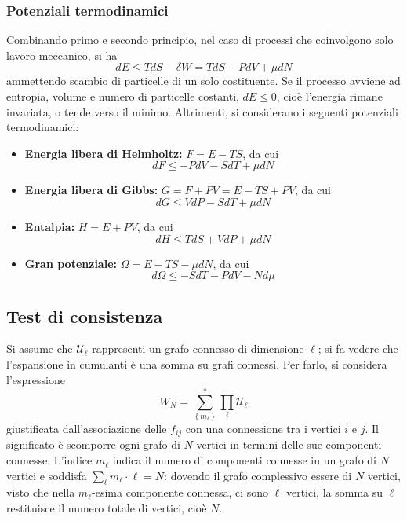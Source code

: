 \documentclass[11pt, a4paper]{scrartcl}
\theoremstyle{style}
\theoremstyle{style1}
\numberwithin{equation}{subsection}
\begin{document}
\subsubsection{Potenziali termodinamici}
Combinando primo e secondo principio, nel caso di processi che coinvolgono solo lavoro meccanico, si ha
\begin{equation}
	dE \le TdS - \delta W = TdS - PdV + \mu dN
\end{equation}
ammettendo scambio di particelle di un solo costituente.
Se il processo avviene ad entropia, volume e numero di particelle costanti, $dE \le 0$, cio\`e l'energia rimane invariata, o tende verso il minimo.
Altrimenti, si considerano i seguenti potenziali termodinamici:
\begin{itemize}
	\item \textbf{Energia libera di Helmholtz:} $F = E - TS$, da cui
	\begin{equation}
		dF \le -PdV - SdT +\mu dN 
	\end{equation}	
\item \textbf{Energia libera di Gibbs:} $G = F+PV = E - TS + PV$, da cui
	\begin{equation}
		dG \le  VdP - SdT + \mu dN
	\end{equation}
\item \textbf{Entalpia:} $H = E + PV$, da cui
	\begin{equation}
		dH \le TdS + VdP + \mu dN
	\end{equation}
\item \textbf{Gran potenziale:} $\Omega = E -TS - \mu dN$, da cui
\begin{equation}
	d\Omega \le -SdT - PdV - N d\mu 
\end{equation}	
\end{itemize}

\subsection{Test di consistenza}
Si assume che $\mathcal{U} _\ell $ rappresenti un grafo connesso di dimensione $\ell $; si fa vedere che l'espansione in cumulanti \`e una somma su grafi connessi.
Per farlo, si considera l'espressione
\[
W_N = \sum_{\left\{ m_\ell  \right\} }^* \prod_\ell \mathcal{U} _\ell 
\] 
giustificata dall'associazione delle $f_{ij} $ con una connessione tra i vertici $i$ e $j$.
Il significato \`e scomporre ogni grafo di $N$ vertici in termini delle sue componenti connesse.
L'indice $m_\ell $ indica il numero di componenti connesse in un grafo di $N$ vertici e soddisfa $\sum_{\ell }^{} m_\ell\cdot \ell = N $: dovendo il grafo complessivo essere di $N$ vertici, visto che nella $m_\ell $-esima componente connessa, ci sono $\ell $ vertici, la somma su $\ell $ restituisce il numero totale di vertici, cio\`e $N$.
\end{document}
